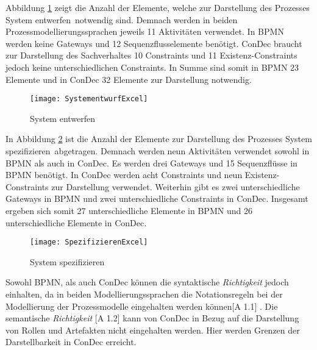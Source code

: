 {Abbildung \ref{fig:SystementwurfExcel} zeigt die Anzahl der Elemente, welche zur Darstellung des Prozesses \grqq System entwerfen\grqq \ notwendig sind. Demnach werden in beiden Prozessmodellierungssprachen jeweils 11 Aktivitäten verwendet. In BPMN werden keine Gateways und 12 Sequenzflusselemente benötigt. ConDec braucht zur Darstellung des Sachverhaltes 10 Constraints und 11 Existenz-Constraints jedoch keine unterschiedlichen Constraints. In Summe sind somit in BPMN 23 Elemente und in ConDec 32 Elemente zur Darstellung notwendig.\newline

\begin{figure}[!htbp]
\begin{center}
  \texttt{[image: SystementwurfExcel]} %
  \caption{System entwerfen}
  \label{fig:SystementwurfExcel}
\end{center}
\end{figure}

In Abbildung \ref{fig:SpezifizierenExcel} ist die Anzahl der Elemente zur Darstellung des Prozesses \grqq System spezifizieren\grqq \ abgetragen. Demnach werden neun Aktivitäten verwendet sowohl in BPMN als auch in ConDec. Es werden drei Gateways und 15 Sequenzflüsse in BPMN benötigt. In ConDec werden acht Constraints und neun Existenz-Constraints zur Darstellung verwendet. Weiterhin gibt es zwei unterschiedliche Gateways in BPMN und zwei unterschiedliche Constraints in ConDec. Insgesamt ergeben sich somit 27 unterschiedliche Elemente in BPMN und 26 unterschiedliche Elemente in ConDec. \newline

\begin{figure}[!htbp]
\begin{center}
  \texttt{[image: SpezifizierenExcel]} %
  \caption{System spezifizieren}
  \label{fig:SpezifizierenExcel}
\end{center}
\end{figure}

Sowohl BPMN, als auch ConDec können die syntaktische \textit{Richtigkeit} jedoch einhalten, da in beiden Modellierungssprachen die Notationsregeln bei der Modellierung der Prozessmodelle eingehalten werden können[A 1.1] .\newline
Die semantische \textit{Richtigkeit} [A 1.2] kann von ConDec in Bezug auf die Darstellung von Rollen und Artefakten nicht eingehalten werden. Hier werden Grenzen der Darstellbarkeit in ConDec erreicht.\newline

}

